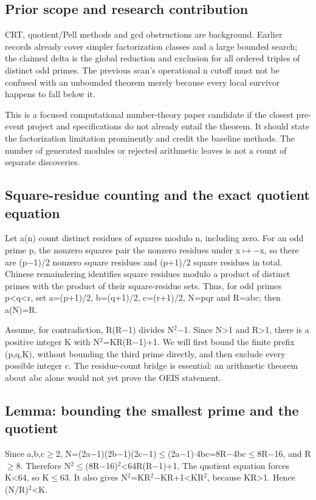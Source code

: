 \documentclass[11pt,a4paper]{article}
\begin{document}
\subsection{Prior scope and research contribution}
CRT, quotient/Pell methods and gcd obstructions are background. Earlier records already cover simpler factorization classes and a large bounded search; the claimed delta is the global reduction and exclusion for all ordered triples of distinct odd primes. The previous scan's operational n cutoff must not be confused with an unbounded theorem merely because every local survivor happens to fall below it.

This is a focused computational number-theory paper candidate if the closest pre-event project and specifications do not already entail the theorem. It should state the factorization limitation prominently and credit the baseline methods. The number of generated modules or rejected arithmetic leaves is not a count of separate discoveries.

\subsection{Square-residue counting and the exact quotient equation}
Let a(n) count distinct residues of squares modulo n, including zero. For an odd prime p, the nonzero squares pair the nonzero residues under x\ensuremath{\mapsto}\ensuremath{-}x, so there are (p\ensuremath{-}1)/2 nonzero square residues and (p+1)/2 square residues in total. Chinese remaindering identifies square residues modulo a product of distinct primes with the product of their square-residue sets. Thus, for odd primes p<q<r, set a=(p+1)/2, b=(q+1)/2, c=(r+1)/2, N=pqr and R=abc; then a(N)=R.

Assume, for contradiction, R(R\ensuremath{-}1) divides N\ensuremath{^2}\ensuremath{-}1. Since N>1 and R>1, there is a positive integer K with N\ensuremath{^2}=KR(R\ensuremath{-}1)+1. We will first bound the finite prefix (p,q,K), without bounding the third prime directly, and then exclude every possible integer c. The residue-count bridge is essential: an arithmetic theorem about abc alone would not yet prove the OEIS statement.

\subsection{Lemma: bounding the smallest prime and the quotient}
Since a,b,c\ensuremath{\geq}2, N=(2a\ensuremath{-}1)(2b\ensuremath{-}1)(2c\ensuremath{-}1)\ensuremath{\leq}(2a\ensuremath{-}1)\ensuremath{\cdot}4bc=8R\ensuremath{-}4bc\ensuremath{\leq}8R\ensuremath{-}16, and R\ensuremath{\geq}8. Therefore N\ensuremath{^2}\ensuremath{\leq}(8R\ensuremath{-}16)\ensuremath{^2}<64R(R\ensuremath{-}1)+1. The quotient equation forces K<64, so K\ensuremath{\leq}63. It also gives N\ensuremath{^2}=KR\ensuremath{^2}\ensuremath{-}KR+1<KR\ensuremath{^2}, because KR>1. Hence (N/R)\ensuremath{^2}<K.
\end{document}
